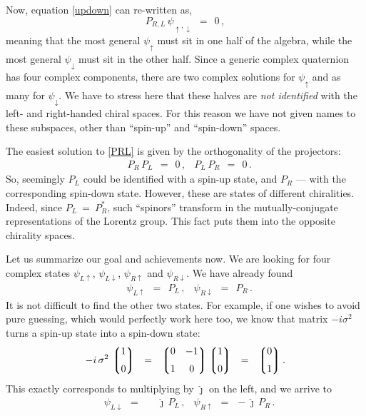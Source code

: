 \documentclass[epsfig,12pt]{article}
\newcommand{\lgr}{\left\lgroup}
\newcommand{\rgr}{\right\rgroup}
\newcommand{\jj}{\hat\jmath}
\begin{document}
	Now, equation \eqref{updown} can re-written as,
\begin{equation}
\label{PRL}
	P_{R,L}\, \psi_{\uparrow,\downarrow}		~~=~~		0\,,
\end{equation}
	meaning that the most general $ \psi_\uparrow $ must sit in one half of the algebra,
	while the most general $ \psi_\downarrow $ must sit in the other half.
	Since a generic complex quaternion has four complex components,
	there are two complex solutions for $ \psi_\uparrow $ and as many for $ \psi_\downarrow $.
	We have to stress here that these halves are \emph{not identified} with the left-
	and right-handed chiral spaces.
	For this reason we have not given names to these subspaces, other than ``spin-up'' and
	``spin-down'' spaces.

	The easiest solution to \eqref{PRL} is given by the orthogonality of the projectors:
\begin{align}
	&
	P_R\, P_L	~~=~~	0\,,
	&
	P_L\, P_R	~~=~~	0\,.
\end{align}
	So, seemingly $ P_L $ could be identified with a spin-up state, and $ P_R $ --- with the corresponding
	spin-down state.
	However, these are states of different chiralities.
	Indeed, since $ P_L ~=~ P_R^* $, such ``spinors'' transform in the mutually-conjugate
	representations of the Lorentz group.
	This fact puts them into the opposite chirality spaces.

	Let us summarize our goal and achievements now.
	We are looking for four complex states $ \psi_{L\uparrow} $, $ \psi_{L\downarrow} $, $ \psi_{R\uparrow} $
	and $ \psi_{R\downarrow} $.
	We have already found
\begin{align}
	&
	\psi_{L\uparrow}		~~=~~	P_L\,,
	&
	\psi_{R\downarrow}	~~=~~	P_R\,.
\end{align}
	It is not difficult to find the other two states.
	For example, if one wishes to avoid pure guessing, which would perfectly work here too,
	we know that matrix $ -i \sigma^2 $ turns a spin-up state into a spin-down state:
\[
	-i\,\sigma^2\,
		\lgr
		\begin{matrix}
			1 \\[2mm]
			0
		\end{matrix}
		\rgr
	~~=~~
		\lgr
		\begin{matrix}
			0	&	-1 \\[2mm]
			1	&	0
		\end{matrix}
		\rgr
		\lgr
		\begin{matrix}
			1 \\[2mm]
			0
		\end{matrix}
		\rgr
	~~=~~
		\lgr
		\begin{matrix}
			0 \\[2mm]
			1
		\end{matrix}
		\rgr.	
\]
	This exactly corresponds to multiplying by $ \jj $ on the left, and we arrive to
\begin{align}
	&
	\psi_{L\downarrow}	~~=~~	\phantom{-}\jj\,P_L\,,
	&
	\psi_{R\uparrow}		~~=~~	-\jj\,P_R\,.
\end{align}
\end{document}
